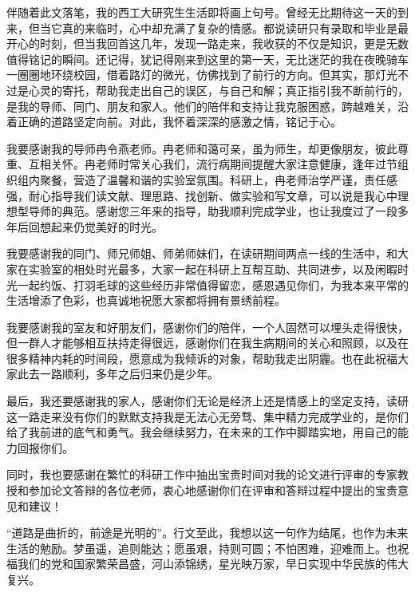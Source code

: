 \documentclass[lang=chs, degree=master, blindreview=false, adobe=false]{yanputhesis}
\begin{document}
\backmatter                                                 %
\begin{acknowledgements}                                    %
伴随着此文落笔，我的西工大研究生生活即将画上句号。曾经无比期待这一天的到来，但当它真的来临时，心中却充满了复杂的情感。都说读研只有录取和毕业是最开心的时刻，但当我回首这几年，发现一路走来，我收获的不仅是知识，更是无数值得铭记的瞬间。还记得，犹记得刚来到这里的第一天，无比迷茫的我在夜晚骑车一圈圈地环绕校园，借着路灯的微光，仿佛找到了前行的方向。但其实，那灯光不过是心灵的寄托，帮助我走出自己的误区，与自己和解；真正指引我不断前行的，是我的导师、同门、朋友和家人。他们的陪伴和支持让我克服困惑，跨越难关，沿着正确的道路坚定向前。对此，我怀着深深的感激之情，铭记于心。

我要感谢我的导师冉令燕老师。冉老师和蔼可亲，虽为师生，却更像朋友，彼此尊重、互相关怀。冉老师时常关心我们，流行病期间提醒大家注意健康，逢年过节组织组内聚餐，营造了温馨和谐的实验室氛围。科研上，冉老师治学严谨，责任感强，耐心指导我们读文献、理思路、找创新、做实验和写文章，可以说是我心中理想型导师的典范。感谢您三年来的指导，助我顺利完成学业，也让我度过了一段多年后回想起来仍觉美好的时光。

我要感谢我的同门、师兄师姐、师弟师妹们，在读研期间两点一线的生活中，和大家在实验室的相处时光最多，大家一起在科研上互帮互助、共同进步，以及闲暇时光一起约饭、打羽毛球的这些经历非常值得留恋，感恩遇见你们，为我本来平常的生活增添了色彩，也真诚地祝愿大家都将拥有景绣前程。

我要感谢我的室友和好朋友们，感谢你们的陪伴，一个人固然可以埋头走得很快，但一群人才能够相互扶持走得很远，感谢你们在我生病期间的关心和照顾，以及在很多精神内耗的时间段，愿意成为我倾诉的对象，帮助我走出阴霾。也在此祝福大家此去一路顺利，多年之后归来仍是少年。

最后，我还要感谢我的家人，感谢你们无论是经济上还是情感上的坚定支持，读研这一路走来没有你们的默默支持我是无法心无旁骛、集中精力完成学业的，是你们给了我前进的底气和勇气。我会继续努力，在未来的工作中脚踏实地，用自己的能力回报你们。

同时，我也要感谢在繁忙的科研工作中抽出宝贵时间对我的论文进行评审的专家教授和参加论文答辩的各位老师，衷心地感谢你们在评审和答辩过程中提出的宝贵意见和建议！

“道路是曲折的，前途是光明的”。行文至此，我想以这一句作为结尾，也作为未来生活的勉励。梦虽遥，追则能达；愿虽艰，持则可圆；不怕困难，迎难而上。也祝福我们的党和国家繁荣昌盛，河山添锦绣，星光映万家，早日实现中华民族的伟大复兴。
\end{acknowledgements}                                      %
\end{document}
